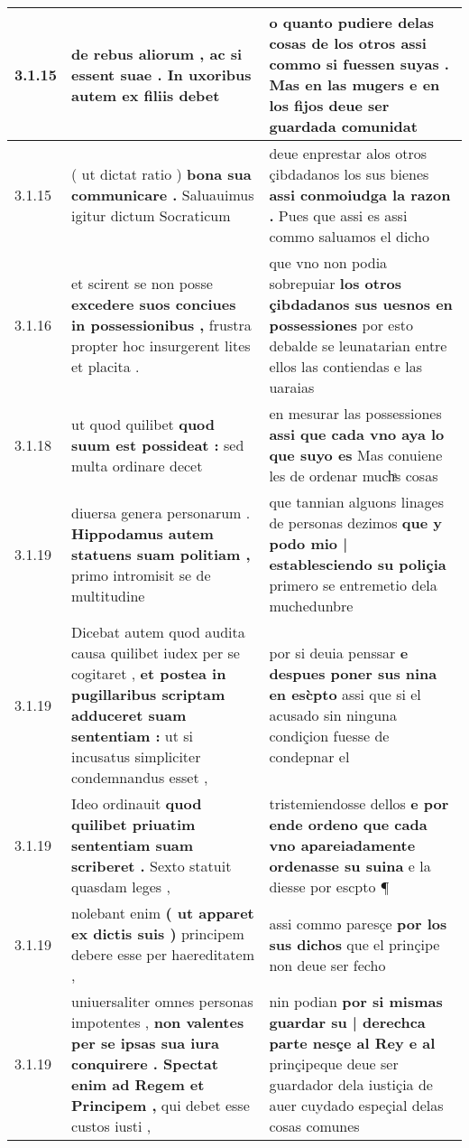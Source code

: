 \begin{tabular}{|p{1cm}|p{6.5cm}|p{6.5cm}|}
3.1.15 & de rebus aliorum , \textbf{ ac si essent suae . } In uxoribus autem ex filiis debet & o quanto pudiere delas cosas de los otros \textbf{ assi commo si fuessen suyas . } Mas en las mugers e en los fijos deue ser guardada comunidat \\\hline
3.1.15 & ( ut dictat ratio ) \textbf{ bona sua communicare . } Saluauimus igitur dictum Socraticum & deue enprestar alos otros çibdadanos los sus bienes \textbf{ assi conmoiudga la razon . } Pues que assi es assi commo saluamos el dicho \\\hline
3.1.16 & et scirent se non posse \textbf{ excedere suos conciues in possessionibus , } frustra propter hoc insurgerent lites et placita . & que vno non podia sobrepuiar \textbf{ los otros çibdadanos sus uesnos en possessiones } por esto debalde se leunatarian entre ellos las contiendas e las uaraias \\\hline
3.1.18 & ut quod quilibet \textbf{ quod suum est possideat : } sed multa ordinare decet & en mesurar las possessiones \textbf{ assi que cada vno aya lo que suyo es } Mas conuiene les de ordenar muchͣs cosas \\\hline
3.1.19 & diuersa genera personarum . \textbf{ Hippodamus autem statuens suam politiam , } primo intromisit se de multitudine & que tannian alguons linages de personas dezimos \textbf{ que y podo mio | establesciendo su poliçia } primero se entremetio dela muchedunbre \\\hline
3.1.19 & Dicebat autem quod audita causa quilibet iudex per se cogitaret , \textbf{ et postea in pugillaribus scriptam adduceret suam sententiam : } ut si incusatus simpliciter condemnandus esset , & por si deuia penssar \textbf{ e despues poner sus nina en esc̀pto } assi que si el acusado sin ninguna condiçion fuesse de condepnar el \\\hline
3.1.19 & Ideo ordinauit \textbf{ quod quilibet priuatim sententiam suam scriberet . } Sexto statuit quasdam leges , & tristemiendosse dellos \textbf{ e por ende ordeno que cada vno apareiadamente ordenasse su suina } e la diesse por escpto ¶ \\\hline
3.1.19 & nolebant enim \textbf{ ( ut apparet ex dictis suis ) } principem debere esse per haereditatem , & assi commo paresçe \textbf{ por los sus dichos } que el prinçipe non deue ser fecho \\\hline
3.1.19 & uniuersaliter omnes personas impotentes , \textbf{ non valentes per se ipsas sua iura conquirere . Spectat enim ad Regem et Principem , } qui debet esse custos iusti , & nin podian \textbf{ por si mismas guardar su | derechca parte nesçe al Rey e al } prinçipeque deue ser guardador dela iustiçia de auer cuydado espeçial delas cosas comunes \\\hline

\end{tabular}
